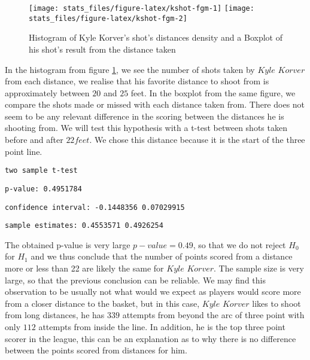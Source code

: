 \documentclass[
  12pt,
]{article}
\begin{document}
\begin{figure}
\texttt{[image: stats\_files/figure-latex/kshot-fgm-1]} \texttt{[image: stats\_files/figure-latex/kshot-fgm-2]} \caption{Histogram of Kyle Korver's shot's distances density and a Boxplot of his shot's result from the distance taken}\label{fig:kshot-fgm}
\end{figure}

In the histogram from figure \ref{fig:kshot-fgm}, we see the number of shots taken by \(Kyle\) \(Korver\) from each distance, we realise that his favorite distance to shoot from is approximately between \(20\) and \(25\) feet.
In the boxplot from the same figure, we compare the shots made or missed with each distance taken from. There does not seem to be any relevant difference in the scoring between the distances he is shooting from. We will test this hypothesis with a t-test between shots taken before and after \(22 feet\). We chose this distance because it is the start of the three point line.

\newpage

\begin{verbatim}
two sample t-test
\end{verbatim}

\begin{verbatim}
p-value: 0.4951784
\end{verbatim}

\begin{verbatim}
confidence interval: -0.1448356 0.07029915
\end{verbatim}

\begin{verbatim}
sample estimates: 0.4553571 0.4926254
\end{verbatim}

The obtained p-value is very large \(p-value=0.49\), so that we do not reject \(H_{0}\) for \(H_1\) and we thus conclude that the number of points scored from a distance more or less than 22 are likely the same for \(Kyle\) \(Korver\). The sample size is very large, so that the previous conclusion can be reliable.
We may find this observation to be usually not what would we expect as players would score more from a closer distance to the basket, but in this case, \(Kyle\) \(Korver\) likes to shoot from long distances, he has \(339\) attempts from beyond the arc of three point with only \(112\) attempts from inside the line. In addition, he is the top three point scorer in the league, this can be an explanation as to why there is no difference between the points scored from distances for him.
\end{document}
